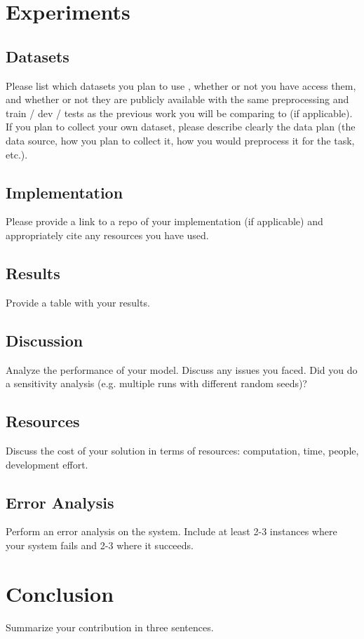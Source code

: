 \documentclass[11pt,a4paper]{article}
\begin{document}
\section{Experiments}

\subsection{Datasets}
Please list which datasets you plan to use , whether or not you have access them, and whether or not they are publicly available with the same preprocessing and train / dev / tests as the previous work you will be comparing to (if applicable). If you plan to collect your own dataset, please describe clearly the data plan (the data source, how you plan to collect it, how you would preprocess it for the task, etc.).

\subsection{Implementation} 
Please provide a link to a repo of your implementation (if applicable) and appropriately cite any resources you have used.

\subsection{Results}
Provide a table with your results.

\subsection{Discussion}
Analyze the performance of your model. Discuss any issues you faced. Did you do a sensitivity analysis (e.g. multiple runs with different random seeds)?

\subsection{Resources}
Discuss the cost of your solution in terms of resources: computation, time, people, development effort.


\subsection{Error Analysis}
Perform an error analysis on the system. Include at least 2-3 instances where your system fails and 2-3 where it succeeds.


\section{Conclusion}
Summarize your contribution in three sentences.
\end{document}
